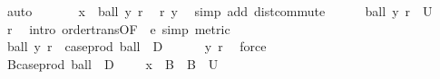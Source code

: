 \begin{isabellebody}
\ auto\isanewline
\isanewline
\ \ \ \ \isamarkupfalse%
\ {\isacharasterisk}{\kern0pt}{\isacharcolon}{\kern0pt}\ {\isachardoublequoteopen}x\ {\isasymin}\ ball\ y\ r{\isachardoublequoteclose}\ \isamarkupfalse%
\ r\ y\ \isamarkupfalse%
\ {\isacharparenleft}{\kern0pt}simp\ add{\isacharcolon}{\kern0pt}\ dist{\isacharunderscore}{\kern0pt}commute{\isacharparenright}{\kern0pt}\isanewline
\ \ \ \ \isamarkupfalse%
\ {\isachardoublequoteopen}ball\ y\ r\ {\isasymsubseteq}\ U{\isachardoublequoteclose}\ \isamarkupfalse%
\ r\ \isamarkupfalse%
\ {\isacharparenleft}{\kern0pt}intro\ order{\isacharunderscore}{\kern0pt}trans{\isacharbrackleft}{\kern0pt}OF\ {\isacharunderscore}{\kern0pt}\ e{\isacharparenleft}{\kern0pt}{}{\isacharparenright}{\kern0pt}{\isacharbrackright}{\kern0pt}{\isacharcomma}{\kern0pt}\ simp{\isacharcomma}{\kern0pt}\ metric{\isacharparenright}{\kern0pt}\isanewline
\ \ \ \ \isamarkupfalse%
\ \isamarkupfalse%
\ {\isachardoublequoteopen}ball\ y\ r\ {\isasymin}\ {\isacharparenleft}{\kern0pt}case{\isacharunderscore}{\kern0pt}prod\ ball\ {\isacharbackquote}{\kern0pt}\ {\isacharparenleft}{\kern0pt}D\ {\isasymtimes}\ {\isacharparenleft}{\kern0pt}{\isasymrat}\ {\isasyminter}\ {\isacharbraceleft}{\kern0pt}{}{\isacharless}{\kern0pt}{\isachardot}{\kern0pt}{\isachardot}{\kern0pt}{\isacharbraceright}{\kern0pt}{\isacharparenright}{\kern0pt}{\isacharparenright}{\kern0pt}{\isacharparenright}{\kern0pt}{\isachardoublequoteclose}\ \isamarkupfalse%
\ y{\isacharparenleft}{\kern0pt}{}{\isacharparenright}{\kern0pt}\ r\ \isamarkupfalse%
\ force\isanewline
\ \ \ \ \isamarkupfalse%
\ \isamarkupfalse%
\ {\isachardoublequoteopen}{\isasymexists}B{\isacharprime}{\kern0pt}{\isasymin}{\isacharparenleft}{\kern0pt}case{\isacharunderscore}{\kern0pt}prod\ ball\ {\isacharbackquote}{\kern0pt}\ {\isacharparenleft}{\kern0pt}D\ {\isasymtimes}\ {\isacharparenleft}{\kern0pt}{\isasymrat}\ {\isasyminter}\ {\isacharbraceleft}{\kern0pt}{}{\isacharless}{\kern0pt}{\isachardot}{\kern0pt}{\isachardot}{\kern0pt}{\isacharbraceright}{\kern0pt}{\isacharparenright}{\kern0pt}{\isacharparenright}{\kern0pt}{\isacharparenright}{\kern0pt}{\isachardot}{\kern0pt}\ x\ {\isasymin}\ B{\isacharprime}{\kern0pt}\ {\isasymand}\ B{\isacharprime}{\kern0pt}\ {\isasymsubseteq}\ U{\isachardoublequoteclose}\ \isamarkupfalse%
\ {\isacharasterisk}{\kern0pt}\ \isamarkupfalse%

\end{isabellebody}
